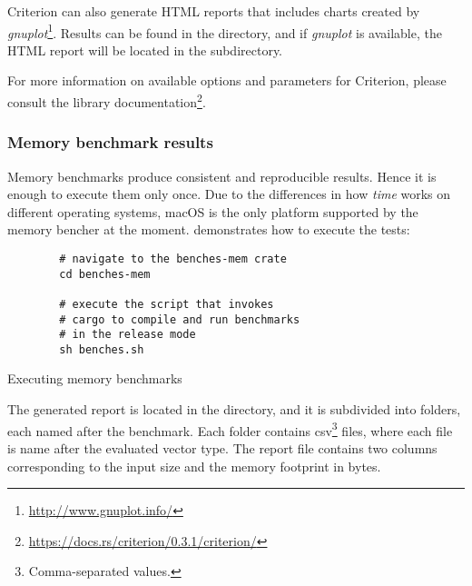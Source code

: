 Criterion can also generate HTML reports that includes charts created by \emph{gnuplot}\footnote{\url{http://www.gnuplot.info/}}. Results can be found in the  directory, and if \emph{gnuplot} is available, the HTML report will be located in the  subdirectory.

For more information on available options and parameters for Criterion, please consult the library documentation\footnote{\url{https://docs.rs/criterion/0.3.1/criterion/}}.

\subsubsection*{Memory benchmark results}
Memory benchmarks produce consistent and reproducible results. Hence it is enough to execute them only once. Due to the differences in how \emph{time} works on different operating systems, macOS is the only platform supported by the memory bencher at the moment.  demonstrates how to execute the tests:

\begin{listing}[!htbp]

    \centering
    \begin{verbatim}
        # navigate to the benches-mem crate
        cd benches-mem

        # execute the script that invokes
        # cargo to compile and run benchmarks
        # in the release mode
        sh benches.sh
    \end{verbatim}

    \caption{Executing memory benchmarks}
    \label{lst:memory-benches}
\end{listing}

The generated report is located in the  directory, and it is subdivided into folders, each named after the benchmark. Each folder contains csv\footnote{Comma-separated values.} files, where each file is name after the evaluated vector type. The report file contains two columns corresponding to the input size and the memory footprint in bytes.
